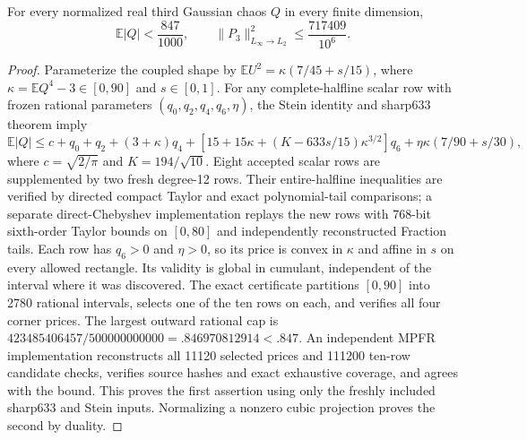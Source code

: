 \begin{theorem}
For every normalized real third Gaussian chaos $Q$ in every finite dimension,
\[
 \mathbb E|Q|<\frac{847}{1000},\qquad
 \|P_3\|_{L_\infty\to L_2}^2\le\frac{717409}{10^6}.
\]
\end{theorem}
\begin{proof}
Parameterize the coupled shape by
$\mathbb E U^2=\kappa(7/45+s/15)$, where
$\kappa=\mathbb E Q^4-3\in[0,90]$ and $s\in[0,1]$.
For any complete-halfline scalar row with frozen rational parameters
$(q_0,q_2,q_4,q_6,\eta)$, the Stein identity and sharp633 theorem imply
\[
\mathbb E|Q|\le c+q_0+q_2+(3+\kappa)q_4
+[15+15\kappa+(K-633s/15)\kappa^{3/2}]q_6
+\eta\kappa(7/90+s/30),
\]
where $c=\sqrt{2/\pi}$ and $K=194/\sqrt{10}$.
Eight accepted scalar rows are supplemented by two fresh degree-12 rows.
Their entire-halfline inequalities are verified by directed compact Taylor
and exact polynomial-tail comparisons; a separate direct-Chebyshev
implementation replays the new rows with 768-bit sixth-order Taylor bounds
on $[0,80]$ and independently reconstructed Fraction tails.
Each row has $q_6>0$ and $\eta>0$, so its price is convex in $\kappa$
and affine in $s$ on every allowed rectangle. Its validity is global in
cumulant, independent of the interval where it was discovered.
The exact certificate partitions $[0,90]$ into 2780 rational intervals,
selects one of the ten rows on each, and verifies all four corner prices.
The largest outward rational cap is
$423485406457/500000000000=.846970812914<.847$.
An independent MPFR implementation reconstructs all 11120 selected
prices and 111200 ten-row candidate checks, verifies source hashes and
exact exhaustive coverage, and agrees with the bound. This proves the
first assertion using only the freshly included sharp633 and Stein inputs.
Normalizing a nonzero cubic projection proves the second by duality.
\end{proof}
